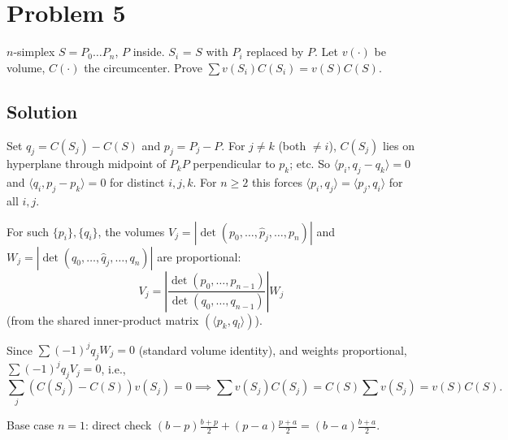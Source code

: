 \documentclass{article}
\begin{document}
\section*{Problem 5}
$n$-simplex $S = P_0 \ldots P_n$, $P$ inside. $S_i$ = $S$ with $P_i$ replaced by $P$. Let $v(\cdot)$ be volume, $C(\cdot)$ the circumcenter. Prove $\sum v(S_i) C(S_i) = v(S) C(S)$.

\subsection*{Solution}
Set $q_j = C(S_j) - C(S)$ and $p_j = P_j - P$. For $j \ne k$ (both $\ne i$), $C(S_j)$ lies on hyperplane through midpoint of $P_k P$ perpendicular to $p_k$; etc. So $\langle p_i, q_j - q_k \rangle = 0$ and $\langle q_i, p_j - p_k \rangle = 0$ for distinct $i, j, k$. For $n \ge 2$ this forces $\langle p_i, q_j \rangle = \langle p_j, q_i \rangle$ for all $i, j$.

For such $\{p_i\}, \{q_i\}$, the volumes $V_j = |\det(p_0, \ldots, \hat p_j, \ldots, p_n)|$ and $W_j = |\det(q_0, \ldots, \hat q_j, \ldots, q_n)|$ are proportional:
\[
V_j = \left|\frac{\det(p_0, \ldots, p_{n-1})}{\det(q_0, \ldots, q_{n-1})}\right| W_j
\]
(from the shared inner-product matrix $(\langle p_k, q_l \rangle)$).

Since $\sum (-1)^j q_j W_j = 0$ (standard volume identity), and weights proportional, $\sum (-1)^j q_j V_j = 0$, i.e.,
\[
\sum_j (C(S_j) - C(S)) v(S_j) = 0 \implies \sum v(S_j) C(S_j) = C(S) \sum v(S_j) = v(S) C(S).
\]

Base case $n = 1$: direct check $(b-p)\tfrac{b+p}{2} + (p-a)\tfrac{p+a}{2} = (b-a)\tfrac{b+a}{2}$.
\end{document}
